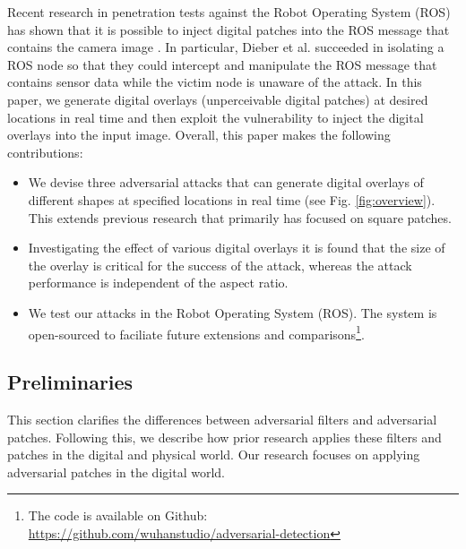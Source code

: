 Recent research in penetration tests against the Robot Operating System (ROS) has shown that it is possible to inject digital patches into the ROS message that contains the camera image \cite{dieber2020penetration}. In particular, Dieber et al. succeeded in isolating a ROS node so that they could intercept and manipulate the ROS message that contains sensor data while the victim node is unaware of the attack. In this paper, we generate digital overlays (unperceivable digital patches) at desired locations in real time and then exploit the vulnerability to inject the digital overlays into the input image. Overall, this paper makes the following contributions:
\begin{itemize}
    \item We devise three adversarial attacks that can generate digital overlays of different shapes at specified locations in real time (see Fig. \ref{fig:overview}). This extends previous research that primarily has focused on square patches.
    \item 
    Investigating the effect of various digital overlays it is found that the size of the overlay is critical for the 
    success of the attack, whereas the attack performance is independent of the aspect ratio.
    
    \item We test our attacks in the Robot Operating System (ROS). The system is open-sourced to faciliate future extensions and comparisons\footnote{The code is available on Github: \url{https://github.com/wuhanstudio/adversarial-detection}}.
\end{itemize}

\subsection{Preliminaries}
\label{section_preliminaries}

This section clarifies the differences between adversarial filters and adversarial patches. Following this, we describe how prior research applies these filters and patches in the digital and physical world. Our research focuses on applying adversarial patches in the digital world.

